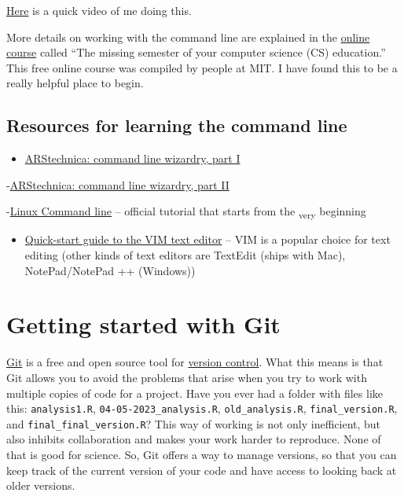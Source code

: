 \documentclass[
]{book}
\providecommand{\tightlist}{%
  \setlength{\itemsep}{0pt}\setlength{\parskip}{0pt}}
\begin{document}
\href{https://youtu.be/f-xsKZVWavo}{Here} is a quick video of me doing this.

More details on working with the command line are explained in the \href{https://missing.csail.mit.edu/}{online course} called ``The missing semester of your computer science (CS) education.'' This free online course was compiled by people at MIT. I have found this to be a really helpful place to begin.

\hypertarget{resources-for-learning-the-command-line}{%
\subsection{Resources for learning the command line}\label{resources-for-learning-the-command-line}}

\begin{itemize}
\tightlist
\item
  \href{https://arstechnica.com/gadgets/2021/08/linux-bsd-command-line-101-using-awk-sed-and-grep-in-the-terminal/}{ARStechnica: command line wizardry, part I}
\end{itemize}

-\href{https://arstechnica.com/gadgets/2021/09/command-line-wizardry-part-two-variables-and-loops-in-bash/}{ARStechnica: command line wizardry, part II}

-\href{http://linuxcommand.org/}{Linux Command line} -- official tutorial that starts from the \textsubscript{very} beginning

\begin{itemize}
\tightlist
\item
  \href{https://eastmanreference.com/a-quick-start-guide-for-beginners-to-the-vim-text-editor}{Quick-start guide to the VIM text editor} -- VIM is a popular choice for text editing (other kinds of text editors are TextEdit (ships with Mac), NotePad/NotePad ++ (Windows))
\end{itemize}

\hypertarget{getting-started-with-git}{%
\section{Getting started with Git}\label{getting-started-with-git}}

\href{https://git-scm.com/}{Git} is a free and open source tool for \href{https://en.wikipedia.org/wiki/Version_control}{version control}. What this means is that Git allows you to avoid the problems that arise when you try to work with multiple copies of code for a project. Have you ever had a folder with files like this: \texttt{analysis1.R}, \texttt{04-05-2023\_analysis.R}, \texttt{old\_analysis.R}, \texttt{final\_version.R}, and \texttt{final\_final\_version.R}? This way of working is not only inefficient, but also inhibits collaboration and makes your work harder to reproduce. None of that is good for science. So, Git offers a way to manage versions, so that you can keep track of the current version of your code and have access to looking back at older versions.
\end{document}
